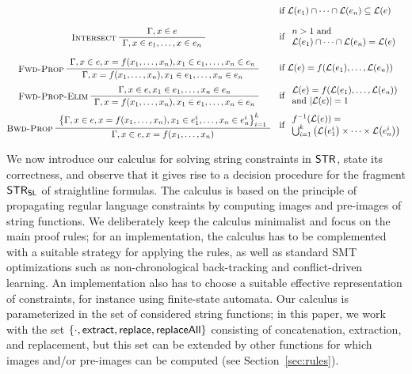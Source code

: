 \begin{table}
\begin{gather*}
\begin{array}{@{}cl@{}}
      &
        \text{if~} \lang{e_1} \cap \cdots \cap\lang{e_n} \subseteq \lang{e}
      \\[2.5ex]
      \infer[Intersect]
      {\seqq{x \in e_1, \ldots, x \in e_n}}
      {\seqq{x \in e}}
      &
        \text{if~}
        \begin{array}{l}
          n > 1 \text{~and~}
          \\
          \lang{e_1} \cap \cdots \cap\lang{e_n} = \lang{e}
        \end{array}
      \\[4ex]
      \infer[Fwd-Prop]
      {\seqq{x = f(x_1, \ldots, x_n), x_1 \in e_1, \ldots, x_n \in e_n}}
      {\seqq{x \in e, x = f(x_1, \ldots, x_n), x_1 \in e_1, \ldots, x_n \in e_n}}
      &
        \text{if~} \lang{e} = f(\lang{e_1}, \ldots, \lang{e_n})
      \\[3ex]
      \infer[Fwd-Prop-Elim]
      {\seqq{x = f(x_1, \ldots, x_n), x_1 \in e_1, \ldots, x_n \in e_n}}
      {\seqq{x \in e, x_1 \in e_1, \ldots, x_n \in e_n}}
      &
        \text{if~}
        \begin{array}{l}
          \lang{e} = f(\lang{e_1}, \ldots, \lang{e_n})
          \\
          \text{and~} 
          |\lang{e}|= 1
          \end{array}
      \\[3ex]
      \infer[Bwd-Prop]
      {\seqq{x \in e, x = f(x_1, \ldots, x_n)}}
      {\big\{\seqq{x \in e, x = f(x_1, \ldots, x_n),
      x_1 \in e_1^i, \ldots, x_n \in e_n^i}\big\}_{i=1}^k}
      &
        \text{if~}
        \begin{array}{l}
          f^{-1}(\lang{e}) = \\
          \bigcup_{i=1}^k \big( \lang{e_1^i} \times \cdots \times \lang{e_n^i} \big)
          \end{array}
    \end{array}
  \end{gather*}
\end{table}

We now introduce our calculus for solving string constraints in
$\mathsf{STR}$, state its correctness, and observe that it gives rise to a
decision procedure for the fragment $\mathsf{STR}_{\mathsf{SL}}$ of straightline
formulas. The calculus is based on the principle of propagating
regular language constraints by computing images and pre-images of
string functions. We deliberately keep the calculus minimalist and
focus on the main proof rules; for an implementation, the calculus has
to be complemented with a suitable strategy for applying the rules, as
well as standard SMT optimizations such as non-chronological
back-tracking and conflict-driven learning. An implementation also has
to choose a suitable effective representation of \regexp{}
constraints, for instance using finite-state automata.
%
Our calculus is parameterized in the set of considered string
functions; in this paper, we work with the set
$\{\cdot, \mathsf{extract}, \mathsf{replace}, \mathsf{replaceAll}\}$ consisting of
concatenation, extraction, and replacement, but this set can be
extended by other functions for which images and/or pre-images can be
computed (see Section~\ref{sec:rules}).

